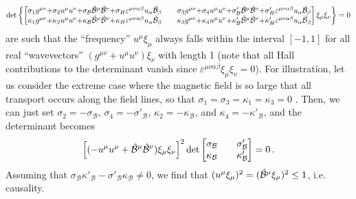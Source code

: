 \documentclass[a4paper, amsfonts, amssymb, amsmath, reprint, showkeys, nofootinbib, twoside,notitlepage]{revtex4-1}
\theoremstyle{definition}
\theoremstyle{theorem}
\begin{document}
\begin{equation}
\det\left\{
\begin{bmatrix}
\sigma_1 g^{\mu \nu}{+}\sigma_2 u^\mu u^\nu{+}\sigma_\mathcal{B} \Hat{\mathcal{B}}^\mu \Hat{\mathcal{B}}^\nu{+}\sigma_H \varepsilon^{\mu \nu \alpha\beta}u_\alpha\Hat{\mathcal{B}}_\beta & &  \sigma_3 g^{\mu \nu}{+}\sigma_4 u^\mu u^\nu{+}\sigma'_\mathcal{B} \Hat{\mathcal{B}}^\mu \Hat{\mathcal{B}}^\nu{+}\sigma'_H \varepsilon^{\mu \nu \alpha\beta}u_\alpha\Hat{\mathcal{B}}_\beta \\  
\kappa_1 g^{\mu \nu}{+}\kappa_2 u^\mu u^\nu{+}\kappa_\mathcal{B} \Hat{\mathcal{B}}^\mu \Hat{\mathcal{B}}^\nu{+}\kappa_H \varepsilon^{\mu \nu \alpha\beta}u_\alpha\Hat{\mathcal{B}}_\beta & & \kappa_3 g^{\mu \nu}{+}\kappa_4 u^\mu u^\nu{+}\kappa'_\mathcal{B} \Hat{\mathcal{B}}^\mu \Hat{\mathcal{B}}^\nu{+}\kappa'_H \varepsilon^{\mu \nu \alpha\beta}u_\alpha\Hat{\mathcal{B}}_\beta\\
\end{bmatrix}\xi_\mu \xi_\nu\right\}=0 
\end{equation}
are such that the ``frequency'' $u^\mu \xi_\mu$ always falls within the interval $[-1,1]$ for all real ``wavevectors'' $(g^{\mu \nu}{+}u^\mu u^\nu)\xi_\nu$ with length 1 (note that all Hall contributions to the determinant vanish since $\varepsilon^{\mu \nu\alpha\beta}\xi_\mu \xi_\nu=0$). For illustration, let us consider the extreme case where the magnetic field is so large that all transport occurs along the field lines, so that $\sigma_1{=}\sigma_3{=}\kappa_1{=}\kappa_3{=}0$ \cite{Chandra:2015iza}. Then, we can just set $\sigma_2{=}{-}\sigma_\mathcal{B}$, $\sigma_4{=}{-}\sigma'_\mathcal{B}$, $\kappa_2{=}{-}\kappa_\mathcal{B}$, and $\kappa_4{=}{-}\kappa'_\mathcal{B}$, and the determinant becomes
\begin{equation}
\left[(-u^\mu u^\mu +\Hat{\mathcal{B}}^\mu\Hat{\mathcal{B}}^\nu)\xi_\mu \xi_\nu\right]^2 \det
\begin{bmatrix}
\sigma_\mathcal{B} & &  \sigma'_\mathcal{B} \\  
\kappa_\mathcal{B} & & \kappa'_\mathcal{B}\\
\end{bmatrix}=0 \, .
\end{equation}
Assuming that $\sigma_\mathcal{B}\kappa'_\mathcal{B}-\sigma'_\mathcal{B}\kappa_\mathcal{B}\neq 0$, we find that $(u^\mu \xi_\mu)^2=(\Hat{\mathcal{B}}^\mu \xi_\mu)^2 \leq 1$, i.e. causality.

\label{lastpage}
\end{document}
